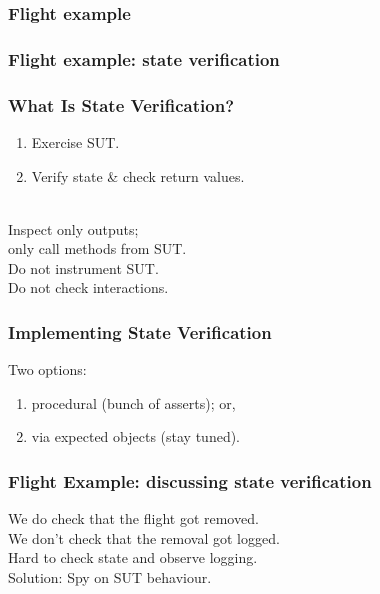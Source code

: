 \documentclass{beamer}
\newenvironment{changemargin}[1]{%
  \begin{list}{}{%
    \setlength{\topsep}{0pt}%
    \setlength{\leftmargin}{#1}%
    \setlength{\rightmargin}{1em}
    \setlength{\listparindent}{\parindent}%
    \setlength{\itemindent}{\parindent}%
    \setlength{\parsep}{\parskip}%
  }%
  \item[]}{\end{list}}
\begin{document}
\begin{frame}
  \frametitle{Flight example}

  \small
    
\end{frame}

\begin{frame}
  \frametitle{Flight example: state verification}

  \small
    
\end{frame}

\begin{frame}
  \frametitle{What Is State Verification?}

  \Large
  \begin{changemargin}{2cm}
    \begin{enumerate}
    \item Exercise SUT.
    \item Verify state \& check return values.
    \end{enumerate}

    ~\\[1em]
    Inspect only outputs; \\ \hspace*{1cm} only call methods from SUT.\\[1em]
    Do not instrument SUT.\\[1em]
    Do not check interactions.
  \end{changemargin}
\end{frame}

\begin{frame}
  \frametitle{Implementing State Verification}

  \Large
  \begin{changemargin}{2cm}
    Two options:
    \begin{enumerate}
    \item procedural (bunch of asserts); or,
    \item via expected objects (stay tuned).
    \end{enumerate}
  \end{changemargin}
\end{frame}

\begin{frame}
  \frametitle{Flight Example: discussing state verification}

  \large
  \begin{changemargin}{2cm}
    We do check that the flight got removed.\\
    We don't check that the removal got logged.\\[1em]
    Hard to check state and observe logging.\\[1em]
    Solution: Spy on SUT behaviour.
  \end{changemargin}
\end{frame}
\end{document}
